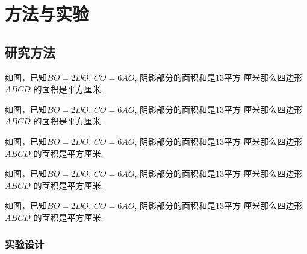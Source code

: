 \documentclass{USTBBook}
\begin{document}
\makeCover

\frontmatter
\pagestyle{fancy}

\setcounter{page}{0}
\cleardoublepage
{}


\tableofcontents

\mainmatter

\part{方法与实验}


\chapter{研究方法} \label{part1:cha:1}

\begin{question}
  如图，已知$BO=2DO$, $CO=6AO$, 阴影部分的面积和是$13$平方
  厘米那么四边形 $ABCD$ 的面积是\fillin[]平方厘米.
\end{question}

\begin{question}
  如图，已知$BO=2DO$, $CO=6AO$, 阴影部分的面积和是$13$平方
  厘米那么四边形 $ABCD$ 的面积是\fillin[]平方厘米.
\end{question}

\begin{question}
  如图，已知$BO=2DO$, $CO=6AO$, 阴影部分的面积和是$13$平方
  厘米那么四边形 $ABCD$ 的面积是\fillin[]平方厘米.
\end{question}

\begin{question}
  如图，已知$BO=2DO$, $CO=6AO$, 阴影部分的面积和是$13$平方
  厘米那么四边形 $ABCD$ 的面积是\fillin[]平方厘米.
\end{question}

\begin{solution}
  如图，已知$BO=2DO$, $CO=6AO$, 阴影部分的面积和是$13$平方
  厘米那么四边形 $ABCD$ 的面积是\fillin[]平方厘米.
\end{solution}

\section{实验设计}
\zhlipsum[11]
\end{document}
